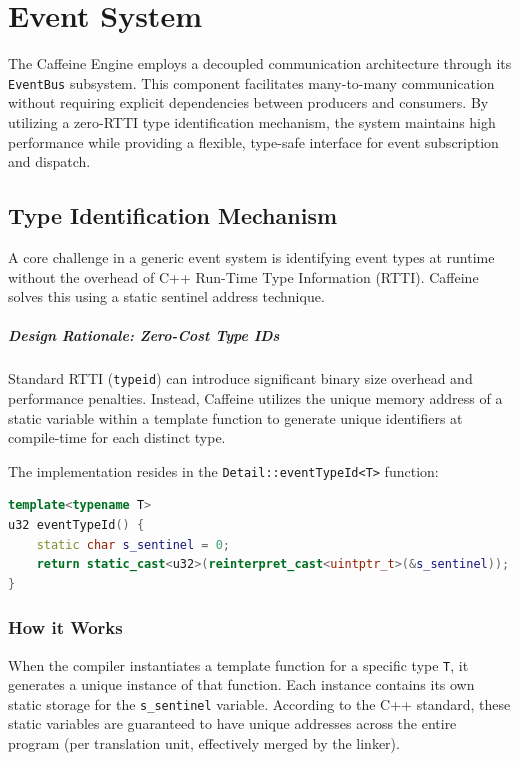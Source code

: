 \chapter{Event System}

The Caffeine Engine employs a decoupled communication architecture through its \texttt{EventBus} subsystem. This component facilitates many-to-many communication without requiring explicit dependencies between producers and consumers. By utilizing a zero-RTTI type identification mechanism, the system maintains high performance while providing a flexible, type-safe interface for event subscription and dispatch.

\section{Type Identification Mechanism}

A core challenge in a generic event system is identifying event types at runtime without the overhead of C++ Run-Time Type Information (RTTI). Caffeine solves this using a static sentinel address technique.


\paragraph{Design Rationale: Zero-Cost Type IDs}

Standard RTTI (\texttt{typeid}) can introduce significant binary size overhead and performance penalties. Instead, Caffeine utilizes the unique memory address of a static variable within a template function to generate unique identifiers at compile-time for each distinct type.



The implementation resides in the \texttt{Detail::eventTypeId<T>} function:

\begin{lstlisting}[language=C++]
template<typename T>
u32 eventTypeId() {
    static char s_sentinel = 0;
    return static_cast<u32>(reinterpret_cast<uintptr_t>(&s_sentinel));
}
\end{lstlisting}

\subsection{How it Works}
When the compiler instantiates a template function for a specific type \texttt{T}, it generates a unique instance of that function. Each instance contains its own static storage for the \texttt{s\_sentinel} variable. According to the C++ standard, these static variables are guaranteed to have unique addresses across the entire program (per translation unit, effectively merged by the linker).

